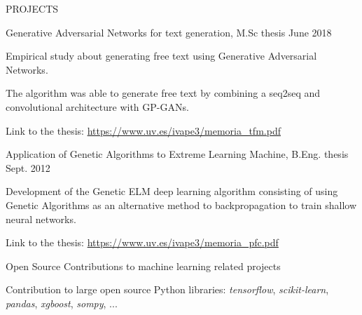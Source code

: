 \documentclass{resume} %
\begin{document}

\begin{rSection}{PROJECTS}

\begin{rSubsection}{Generative Adversarial Networks for text generation, M.Sc thesis}
{June 2018}{}{}  %

\vspace{-3pt}

\item Empirical study about generating free text using Generative Adversarial Networks.
\item The algorithm was able to generate free text by combining a seq2seq and convolutional architecture with GP-GANs.
\item Link to the thesis: \url{https://www.uv.es/ivape3/memoria_tfm.pdf}

\end{rSubsection}

\vspace{-6pt}

\begin{rSubsection}{Application of Genetic Algorithms to Extreme Learning Machine, B.Eng. thesis}
{Sept. 2012}{}{}  

\vspace{-3pt}

\item Development of the Genetic ELM deep learning algorithm consisting of using Genetic Algorithms as an alternative method to backpropagation to train shallow neural networks.
\item Link to the thesis: \url{https://www.uv.es/ivape3/memoria_pfc.pdf}

\end{rSubsection}

\vspace{-6pt}

\begin{rSubsection}{Open Source Contributions to machine learning related projects}
{}{}{}  

\vspace{-3pt}

\item Contribution to large open source Python libraries: \textit{tensorflow}, \textit{scikit-learn}, \textit{pandas}, \textit{xgboost}, \textit{sompy}, ... 

\end{rSubsection}


\end{rSection}
\end{document}
